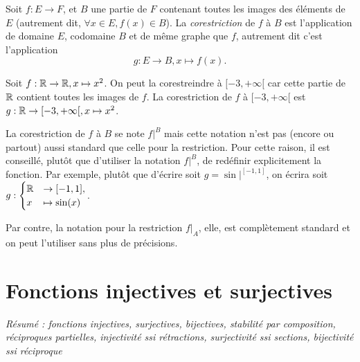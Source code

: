 \begin{definition}[Corestriction]
\label{def-corestriction}
Soit $f : E\to F$, et $B$ une partie de $F$ contenant toutes les images des éléments de $E$ (autrement dit, $\forall x\in E, f(x)\in B$).
La \emph{corestriction} de $f$ à $B$ est l'application de domaine $E$, codomaine $B$ et de même graphe que $f$, autrement dit c'est l'application 
\[ g : E\to B, x\mapsto f(x).\]
\end{definition}




\begin{exemple}
Soit $f : \mathbb{R}\to \mathbb{R}, x\mapsto x^2$. On peut la corestreindre à $[-3,+\infty[$ car cette partie de $\mathbb{R}$ contient toutes les images de $f$. La corestriction de $f$ à $[-3,+\infty[$ est $g : \mathbb{R}\to [-3,+\infty[, x\mapsto x^2$.
\end{exemple}


\begin{attention}
La corestriction de $f$ à $B$ se note $f|^{B}$ mais cette notation n'est pas (encore ou partout) aussi standard que celle pour la restriction. Pour cette raison, il est conseillé, plutôt que d'utiliser la notation $f|^{B}$, de redéfinir explicitement la fonction. Par exemple, plutôt que d'écrire \og soit $g=\sin|^{[-1,1]}$\fg, on écrira \og soit $g : \begin{cases} \mathbb{R}&\to [-1,1],\\ x&\mapsto \sin(x)\end{cases}$.\fg{}

Par contre, la notation pour la restriction $f|_A$, elle, est complètement standard et on peut l'utiliser sans plus de précisions.
\end{attention}


\section{Fonctions injectives et surjectives}

\emph{Résumé : fonctions injectives, surjectives, bijectives, stabilité par composition, réciproques partielles, injectivité ssi rétractions, surjectivité ssi  sections, bijectivité ssi réciproque}




